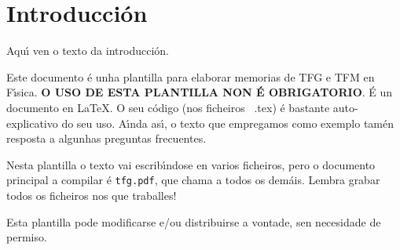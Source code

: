 \section{Introducci\'on}

Aqu\'{\i} ven o texto da introducci\'on. 

Este documento \'e unha plantilla para elaborar memorias de TFG e TFM en F\'{\i}sica. {\bf O USO DE ESTA PLANTILLA NON \'E OBRIGATORIO}. \'E un documento en \LaTeX. O seu c\'odigo (nos ficheiros~ .tex) \'e bastante  auto-explicativo do seu uso. A\'{\i}nda as\'{\i}, o texto que empregamos como exemplo tam\'en resposta a algunhas preguntas frecuentes.

Nesta plantilla o texto vai escrib\'{\i}ndose en varios ficheiros, pero o documento principal a compilar \'e {\tt tfg.pdf}, que chama a todos os dem\'ais. Lembra  grabar todos os ficheiros nos que traballes!

Esta plantilla pode modificarse e/ou distribuirse a vontade, sen necesidade de permiso.